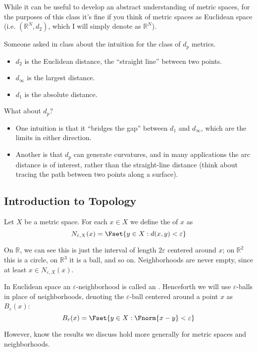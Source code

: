 \documentclass{article}
\begin{document}
While it can be useful to develop an abstract understanding of metric spaces, for the purposes of this class it's fine if you think of metric spaces as Euclidean space (i.e. $(\mathbb{R}^N, d_2)$, which I will simply denote as $\mathbb{R}^N$).
\begin{remark}
  Someone asked in class about the intuition for the class of $d_p$ metrics. 
  \begin{itemize}[label=$\bullet$]
    \item $d_2$ is the Euclidean distance, the ``straight line'' between two points.

    \item $d_{\infty}$ is the largest distance.

    \item $d_1$ is the absolute distance.
  \end{itemize}

  What about $d_p$?
  \begin{itemize}[label=$\bullet$]
    \item One intuition is that it ``bridges the gap'' between $d_1$ and $d_{\infty}$, which are the limits in either direction.

    \item Another is that $d_p$ can generate curvatures, and in many applications the arc distance is of interest, rather than the straight-line distance (think about tracing the path between two points along a surface).
  \end{itemize}
\end{remark}

\subsection{Introduction to Topology}
\label{sub:introduction_to_topology}

\begin{definition}\label{def:lecture1_neighborhood}
  Let $X$ be a metric space. For each $x \in X$ we define the  of $x$ as
  \[
    N_{\varepsilon, X}(x) = \Fset{y \in X: d(x, y) < \varepsilon}
  \]
\end{definition}

On $\mathbb{R}$, we can see this is just the interval of length $2\varepsilon$ centered around $x$; on $\mathbb{R}^2$ this is a circle, on $\mathbb{R}^3$ it is a ball, and so on. Neighborhoods are never empty, since at least $x \in N_{\varepsilon, X}(x)$.
\begin{remark}
  In Euclidean space an $\varepsilon$-neighborhood is called an . Henceforth we will use $\varepsilon$-balls in place of neighborhoods, denoting the $\varepsilon$-ball centered around a point $x$ as $B_{\varepsilon}(x)$:
  \[
    B_{\varepsilon}(x) = \Fset{y \in X: \Fnorm{x - y} < \varepsilon}
  \]

  However, know the results we discuss hold more generally for metric spaces and neighborhoods.
\end{remark}
\end{document}
